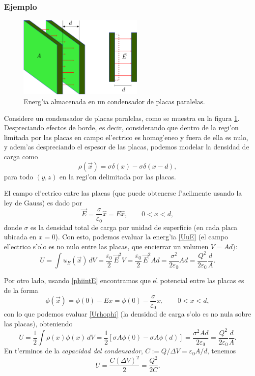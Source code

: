 \subsubsection{Ejemplo}
\begin{figure}[!h]
\centerline{\includegraphics[height=4cm]{fig/fig-condensador-01.pdf}}
\caption{Energ'ia almacenada en un condensador de placas paralelas.}
\label{fig:cpp}
\end{figure}
Considere un condensador de placas paralelas, como se muestra en la figura \ref{fig:cpp}. Despreciando efectos de borde, es decir, considerando que dentro de la regi'on limitada por las placas en campo el'ectrico es homog'eneo y fuera de ella es nulo, y adem'as despreciando el espesor de las placas, podemos modelar la densidad de carga como
\begin{equation}
\rho(\vec{x})=\sigma\delta(x)-\sigma\delta(x-d), 
\end{equation}
para todo $(y,z)$ en la regi'on delimitada por las placas. 

El campo el'ectrico entre las placas (que puede obtenerse f'acilmente usando la ley de Gauss) es dado por
\begin{equation}
\vec{E}=\frac{\sigma}{\varepsilon_0}\hat{x}=E\hat{x}, \qquad 0<x<d,
\end{equation}
donde $\sigma$ es la densidad total de carga por unidad de superficie (en cada placa ubicada en $x=0$). Con esto, podemos evaluar la energ'ia \eqref{UuE} (el campo el'ectrico s'olo es no nulo entre las placas, que encierrar un volumen $V=Ad$):
\begin{equation} 
U=\int u_E(\vec{x})\,dV=\frac{\varepsilon_0}{2}\,
\vec{E}^2 V=\frac{\varepsilon_0}{2}\,
\vec{E}^2 Ad=\frac{\sigma^2}{2\varepsilon_0}Ad=\frac{Q^2}{2\varepsilon_0}\frac{d}{A} .
\end{equation}

Por otro lado, usando \eqref{phiintE} encontramos que el potencial entre las placas es de la forma
\begin{equation}
\phi(\vec{x})=\phi(0)-Ex=\phi(0)-\frac{\sigma}{\varepsilon_0}x, \qquad 0<x<d,
\end{equation}
con lo que podemos evaluar \eqref{Urhophi} (la densidad de carga s'olo es no nula sobre las placas), obteniendo
\begin{equation}
U=\frac{1}{2}\int\rho(x)\phi(x)\,dV=\frac{1}{2}\left[\sigma A\phi(0)-\sigma A\phi(d)\right]=\frac{\sigma^2 Ad}{2\varepsilon_0}=\frac{Q^2}{2\varepsilon_0}\frac{d}{A}.
\end{equation}
En t'erminos de la \textit{capacidad del condensador}, $C:=Q/\Delta V=\varepsilon_0 A/d$, tenemos
\begin{equation}
U=\frac{C(\Delta V)^2}{2}=\frac{Q^2}{2C}.
\end{equation}





